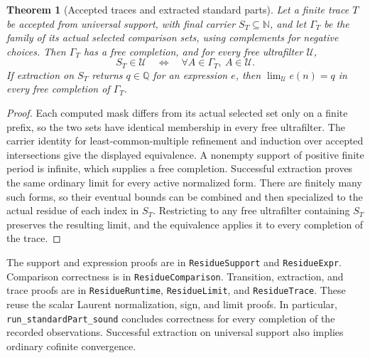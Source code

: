 \documentclass[11pt,a4paper]{article}
\theoremstyle{result}
\newtheorem{theorem}{Theorem}
\theoremstyle{definition}
\newcommand{\N}{\mathbb{N}}
\newcommand{\Q}{\mathbb{Q}}
\newcommand{\PUF}{\mathcal{U}}
\newcommand{\code}[1]{\texttt{#1}}
\begin{document}
\begin{theorem}[Accepted traces and extracted standard parts]\label{thm:laurent-runtime}
  Let a finite trace $T$ be accepted from universal support, with final carrier $S_T\subseteq\N$, and let $\Gamma_T$ be the family of its actual selected comparison sets, using complements for negative choices. Then $\Gamma_T$ has a free completion, and for every free ultrafilter $\PUF$,
  \[
    S_T\in\PUF\quad\Longleftrightarrow\quad
    \forall A\in\Gamma_T,\ A\in\PUF.
  \]
  If extraction on $S_T$ returns $q\in\Q$ for an expression $e$, then $\lim_{\PUF}e(n)=q$ in every free completion of $\Gamma_T$.
\end{theorem}
\begin{proof}
  Each computed mask differs from its actual selected set only on a finite prefix, so the two sets have identical membership in every free ultrafilter. The carrier identity for least-common-multiple refinement and induction over accepted intersections give the displayed equivalence. A nonempty support of positive finite period is infinite, which supplies a free completion. Successful extraction proves the same ordinary limit for every active normalized form. There are finitely many such forms, so their eventual bounds can be combined and then specialized to the actual residue of each index in $S_T$. Restricting to any free ultrafilter containing $S_T$ preserves the resulting limit, and the equivalence applies it to every completion of the trace.
\end{proof}

The support and expression proofs are in \code{ResidueSupport} and \code{ResidueExpr}. Comparison correctness is in \code{ResidueComparison}. Transition, extraction, and trace proofs are in \code{ResidueRuntime}, \code{ResidueLimit}, and \code{ResidueTrace}. These reuse the scalar Laurent normalization, sign, and limit proofs. In particular, \code{run\_standardPart\_sound} concludes correctness for every completion of the recorded observations. Successful extraction on universal support also implies ordinary cofinite convergence.
\end{document}
